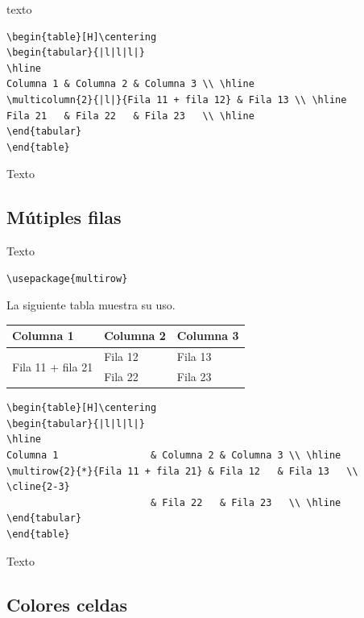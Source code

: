\documentclass[letterpaper, 10pt, journal]{IEEEtran}
\begin{document}
texto

\lstset{language=Java}
\begin{lstlisting}
\begin{table}[H]\centering
\begin{tabular}{|l|l|l|}
\hline
Columna 1 & Columna 2 & Columna 3 \\ \hline
\multicolumn{2}{|l|}{Fila 11 + fila 12} & Fila 13 \\ \hline
Fila 21   & Fila 22   & Fila 23   \\ \hline
\end{tabular}
\end{table}
\end{lstlisting}
Texto
\subsection{M\'utiples filas}
Texto

\lstset{language=Java}
\begin{lstlisting}
\usepackage{multirow}
\end{lstlisting}

La siguiente tabla muestra su uso.
\begin{table}[H]\centering
\begin{tabular}{|l|l|l|}
\hline
Columna 1                & Columna 2 & Columna 3 \\ \hline
\multirow{2}{*}{Fila 11 + fila 21} & Fila 12   & Fila 13   \\ \cline{2-3} 
                         & Fila 22   & Fila 23   \\ \hline
\end{tabular}
\end{table}

\lstset{language=Java}
\begin{lstlisting}
\begin{table}[H]\centering
\begin{tabular}{|l|l|l|}
\hline
Columna 1                & Columna 2 & Columna 3 \\ \hline
\multirow{2}{*}{Fila 11 + fila 21} & Fila 12   & Fila 13   \\ \cline{2-3} 
                         & Fila 22   & Fila 23   \\ \hline
\end{tabular}
\end{table}
\end{lstlisting}

Texto

\subsection{Colores celdas}
\end{document}
